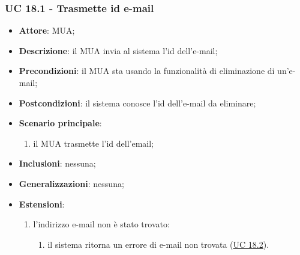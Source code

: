 \subsubsection{UC 18.1 - Trasmette id e-mail} \label{sec:UC18.1}
\begin{itemize}
    \item \textbf{Attore}: MUA;
    \item \textbf{Descrizione}: il MUA invia al sistema l'id dell'e-mail;
    \item \textbf{Precondizioni}: il MUA sta usando la funzionalità di eliminazione di un'e-mail;
    \item \textbf{Postcondizioni}: il sistema conosce l'id dell'e-mail da eliminare;
    \item \textbf{Scenario principale}:
        \begin{enumerate}
            \item il MUA trasmette l'id dell'email;
        \end{enumerate}
    \item \textbf{Inclusioni}: nessuna;
    \item \textbf{Generalizzazioni}: nessuna;
    \item \textbf{Estensioni}:
        \begin{enumerate}[label=\alph*.]
            \item l'indirizzo e-mail non è stato trovato:
            \begin{enumerate}[label=\arabic*.]
                \item il sistema ritorna un errore di e-mail non trovata (\hyperref[sec:UC18.2]{UC 18.2}).
            \end{enumerate}
        \end{enumerate}
\end{itemize}


